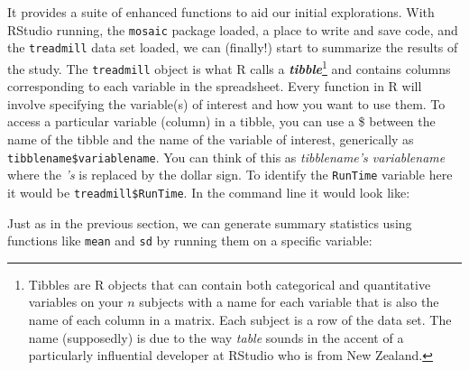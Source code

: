 \documentclass[
]{book}
\newenvironment{Shaded}{\begin{snugshade}}{\end{snugshade}}
\newcommand{\DecValTok}[1]{\textcolor[rgb]{0.00,0.00,0.81}{#1}}
\newcommand{\FloatTok}[1]{\textcolor[rgb]{0.00,0.00,0.81}{#1}}
\newcommand{\NormalTok}[1]{#1}
\newcommand{\SpecialCharTok}[1]{\textcolor[rgb]{0.00,0.00,0.00}{#1}}
\begin{document}
It provides a suite of enhanced functions to aid our initial explorations. With RStudio running, the \texttt{mosaic} package loaded, a place to write and
save code, and the \texttt{treadmill} data set loaded, we can (finally!) start to
summarize the results of the study. The \texttt{treadmill} object is what R calls a
\textbf{\emph{tibble}}\footnote{Tibbles are R objects that can contain both
  categorical and quantitative variables on your \(n\) subjects with a name for each
  variable that is also the name of each column in a matrix.  Each subject is a
  row of the data set. The name (supposedly) is due to the way \emph{table} sounds in the accent of a particularly influential developer at RStudio who is from New Zealand.} and contains columns corresponding to each variable in
the spreadsheet. Every
function in R will involve specifying the variable(s) of interest and how you
want to use them. To access a particular variable (column) in a tibble, you
can use a \$ between the name of the tibble and the name of the variable of
interest, generically as \texttt{tibblename\$variablename}. You can think of this as \emph{tibblename's variablename} where the \emph{'s} is replaced by the dollar sign. To identify the
\texttt{RunTime} variable here it would be \texttt{treadmill\$RunTime}. In the command line it would look like:

\begin{Shaded}
\end{Shaded}

\indent Just as in the previous section, we can generate summary statistics using functions like \texttt{mean} and \texttt{sd} by running them on a specific variable:
\end{document}

